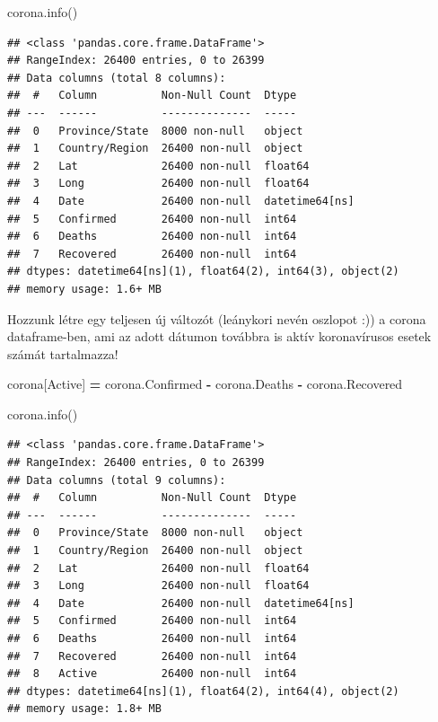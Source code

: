 \documentclass[
]{book}
\newenvironment{Shaded}{\begin{snugshade}}{\end{snugshade}}
\newcommand{\NormalTok}[1]{#1}
\newcommand{\OperatorTok}[1]{\textcolor[rgb]{0.81,0.36,0.00}{\textbf{#1}}}
\newcommand{\StringTok}[1]{\textcolor[rgb]{0.31,0.60,0.02}{#1}}
\begin{document}
\begin{Shaded}
\begin{Highlighting}[]
\NormalTok{corona.info()}
\end{Highlighting}
\end{Shaded}

\begin{verbatim}
## <class 'pandas.core.frame.DataFrame'>
## RangeIndex: 26400 entries, 0 to 26399
## Data columns (total 8 columns):
##  #   Column          Non-Null Count  Dtype         
## ---  ------          --------------  -----         
##  0   Province/State  8000 non-null   object        
##  1   Country/Region  26400 non-null  object        
##  2   Lat             26400 non-null  float64       
##  3   Long            26400 non-null  float64       
##  4   Date            26400 non-null  datetime64[ns]
##  5   Confirmed       26400 non-null  int64         
##  6   Deaths          26400 non-null  int64         
##  7   Recovered       26400 non-null  int64         
## dtypes: datetime64[ns](1), float64(2), int64(3), object(2)
## memory usage: 1.6+ MB
\end{verbatim}

Hozzunk létre egy teljesen új változót (leánykori nevén oszlopot :)) a corona dataframe-ben, ami az adott dátumon továbbra is aktív koronavírusos esetek számát tartalmazza!

\begin{Shaded}
\begin{Highlighting}[]
\NormalTok{corona[}\StringTok{\textquotesingle{}Active\textquotesingle{}}\NormalTok{] }\OperatorTok{=}\NormalTok{ corona.Confirmed }\OperatorTok{{-}}\NormalTok{ corona.Deaths }\OperatorTok{{-}}\NormalTok{ corona.Recovered}

\NormalTok{corona.info()}
\end{Highlighting}
\end{Shaded}

\begin{verbatim}
## <class 'pandas.core.frame.DataFrame'>
## RangeIndex: 26400 entries, 0 to 26399
## Data columns (total 9 columns):
##  #   Column          Non-Null Count  Dtype         
## ---  ------          --------------  -----         
##  0   Province/State  8000 non-null   object        
##  1   Country/Region  26400 non-null  object        
##  2   Lat             26400 non-null  float64       
##  3   Long            26400 non-null  float64       
##  4   Date            26400 non-null  datetime64[ns]
##  5   Confirmed       26400 non-null  int64         
##  6   Deaths          26400 non-null  int64         
##  7   Recovered       26400 non-null  int64         
##  8   Active          26400 non-null  int64         
## dtypes: datetime64[ns](1), float64(2), int64(4), object(2)
## memory usage: 1.8+ MB
\end{verbatim}
\end{document}
